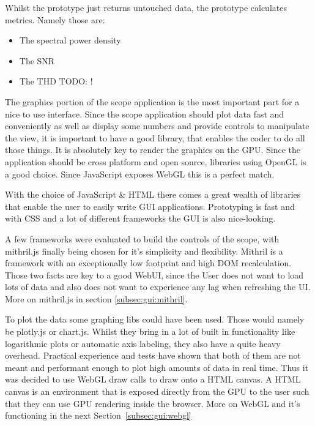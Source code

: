 Whilst  the    prototype  just  returns  untouched  data,  the
 prototype calculates metrics. Namely those are:
\begin{itemize}\tightlist
    \item The spectral power density
    \item The SNR
    \item The THD TODO: !
\end{itemize}

The graphics portion of the scope application is the most important part for a
nice to use  interface. Since the scope application should plot  data fast and
conveniently  as  well  as  display  some  numbers  and  provide  controls  to
manipulate the view, it is important to  have a good library, that enables the
coder to do all  those things. It is absolutely key to  render the graphics on
the  GPU. Since the  application should  be  cross platform  and open  source,
libraries using OpenGL  is a good choice. Since JavaScript  exposes WebGL this
is a perfect match.

With the choice of JavaScript \& HTML  there comes a great wealth of libraries
that enable the user to easily write GUI applications. Prototyping is fast and
with CSS and a lot of different frameworks the GUI is also nice-looking.

A  few frameworks  were evaluated  to build  the controls  of the  scope, with
mithril.js finally  being chosen for it's  simplicity and flexibility. Mithril
is a framework with an exceptionally low footprint and high DOM recalculation.
Those two facts are key to a good  WebUI, since the User does not want to load
lots of data and also does not  want to experience any lag when refreshing the
UI.
More on mithril.js in section \ref{subsec:gui:mithril}.

To plot the  data some graphing libs could have  been used. Those would namely
be plotly.js or chart.js. Whilst they bring in a lot of built in functionality
like logarithmic  plots or  automatic axis  labeling, they  also have  a quite
heavy overhead.
Practical experience and tests have shown that  both of them are not meant and
performant enough to plot high amounts of data in real time.
Thus it was decided to use WebGL draw calls to draw onto a HTML canvas. A HTML
canvas is  an environment that  is exposed directly from  the GPU to  the user
such that they can use GPU rendering inside the browser.
More on WebGL and it's functioning in the next Section~\ref{subsec:gui:webgl}

